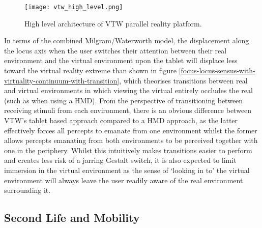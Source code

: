 \begin{figure}[h]
\centering
  \texttt{[image: vtw\_high\_level.png]}
  \caption{High level architecture of VTW parallel reality platform.}
  \label{vtw_high_level.png}
\end{figure}

In terms of the combined Milgram/Waterworth model, the displacement along the locus axis when the user switches their attention between their real environment and the virtual environment upon the tablet will displace less toward the virtual reality extreme than shown in figure \ref{focus-locus-sensus-with-virtuality-continuum-with-transition}, which theorises transitions between real and virtual environments in which viewing the virtual entirely occludes the real (such as when using a HMD). From the perspective of transitioning between receiving stimuli from each environment, there is an obvious difference between VTW's tablet based approach compared to a HMD approach, as the latter effectively forces all percepts to emanate from one environment whilst the former allows percepts emanating from both environments to be perceived together with one in the periphery. Whilst this intuitively makes transitions easier to perform and creates less risk of a jarring Gestalt switch, it is also expected to limit immersion in the virtual environment as the sense of `looking in to' the virtual environment will always leave the user readily aware of the real environment surrounding it.




\subsection{Second Life and Mobility}

\label{SecondLifeMobility}

\newcommand{\LumiyaFootnote}{\footnote{\url{https://play.google.com/store/apps/details?id=com.lumiyaviewer.lumiya&hl=en_GB}}}


